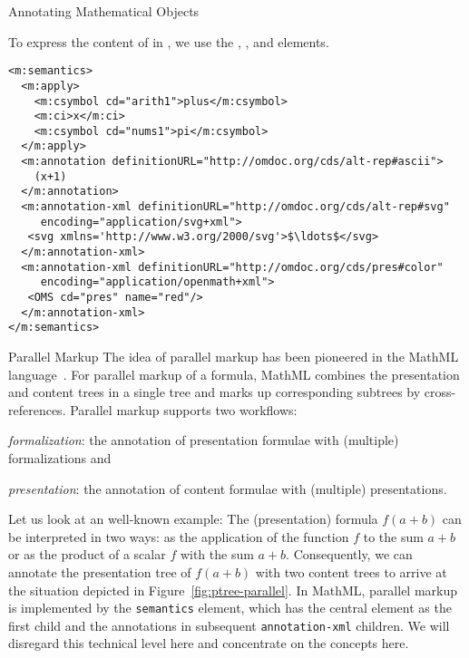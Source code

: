 \begin{omgroup}[id=mobj,short=Mathematical Objects]
\begin{omgroup}[id=annotating]{Annotating Mathematical Objects}
\begin{example}[id=semantics.ex]
  To express the content of  in \cmathml, we use the
  , , and
   elements.
\begin{lstlisting}[language=MathML,label=lst:semantics,mathescape,
                   caption={Associating Alternate Representations in \cmathml},
                   numbers=none,index={m:semantics,m:annotation-xml,m:annotation}]
<m:semantics>
  <m:apply>
    <m:csymbol cd="arith1">plus</m:csymbol>
    <m:ci>x</m:ci>
    <m:csymbol cd="nums1">pi</m:csymbol>
  </m:apply>
  <m:annotation definitionURL="http://omdoc.org/cds/alt-rep#ascii"> 
    (x+1)
  </m:annotation>
  <m:annotation-xml definitionURL="http://omdoc.org/cds/alt-rep#svg" 
     encoding="application/svg+xml">
   <svg xmlns='http://www.w3.org/2000/svg'>$\ldots$</svg>
  </m:annotation-xml>
  <m:annotation-xml definitionURL="http://omdoc.org/cds/pres#color" 
     encoding="application/openmath+xml"> 
   <OMS cd="pres" name="red"/>
  </m:annotation-xml>
</m:semantics>
\end{lstlisting}
\end{example}
\end{omgroup}

\begin{omgroup}{Parallel Markup}
  The idea of parallel markup has been pioneered in the MathML
  language~\cite{CarlisleEd:MathML3}. For parallel markup of a formula, MathML combines
  the presentation and content trees in a single \xml tree and marks up corresponding
  subtrees by cross-references. Parallel markup supports two workflows:
\begin{compactenum}
\item \emph{formalization}: the annotation of presentation formulae with (multiple)
  formalizations and
\item \emph{presentation}: the annotation of content formulae with (multiple)
  presentations.
\end{compactenum}
Let us look at an well-known example: The (presentation) formula $f(a+b)$ can be
interpreted in two ways: as the application of the function $f$ to the sum $a+b$ or as the
product of a scalar $f$ with the sum $a+b$. Consequently, we can annotate the presentation
tree of $f(a+b)$ with two content trees to arrive at the situation depicted in
Figure~\ref{fig:ptree-parallel}. In MathML, parallel markup is implemented by the
\lstinline|semantics| element, which has the central element as the first child and the
annotations in subsequent \lstinline|annotation-xml| children. We will disregard this
technical level here and concentrate on the concepts here.


\end{omgroup}
\end{omgroup}
